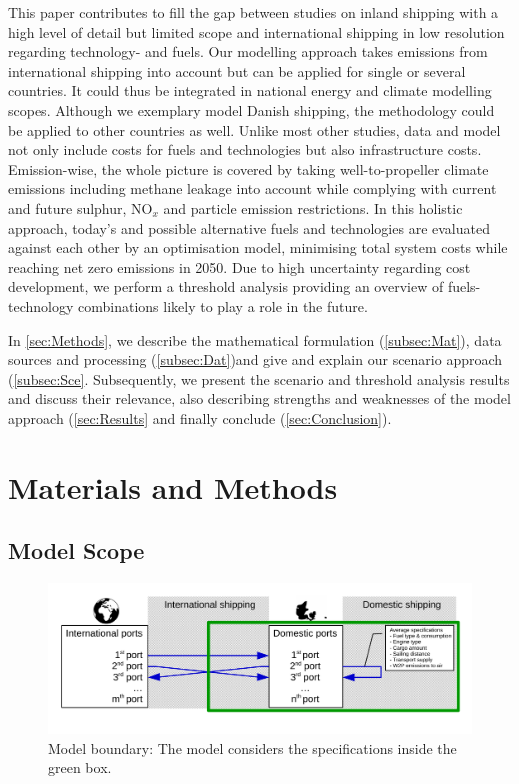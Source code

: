 \documentclass[article]{elsarticle}
\begin{document}
This paper contributes to fill the gap between studies on inland shipping  with a high level of detail but limited scope and international shipping in low resolution regarding technology- and fuels. Our modelling approach takes emissions from international shipping into account but can be applied for single or several countries. It could thus be integrated in national energy and climate modelling scopes. Although we exemplary model Danish shipping, the methodology could be applied to other countries as well.
Unlike most other studies, data and model not only include costs for fuels and technologies but also infrastructure costs. Emission-wise, the whole picture is covered by taking well-to-propeller climate emissions including methane leakage into account while complying with current and future sulphur, NO$_x$ and particle emission restrictions.
In this holistic approach, today's and possible alternative fuels and technologies are evaluated against each other by an optimisation model, minimising total system costs while reaching net zero emissions in 2050. Due to high uncertainty regarding cost development, we perform a threshold analysis providing an overview of fuels-technology combinations likely to play a role in the future.

In \autoref{sec:Methods}, we describe the mathematical formulation (\autoref{subsec:Mat}), data sources and processing (\autoref{subsec:Dat})and give and explain our scenario approach (\autoref{subsec:Sce}. Subsequently, we present the scenario and threshold analysis results and discuss their relevance, also describing strengths and weaknesses of the model approach (\autoref{sec:Results} and finally conclude (\autoref{sec:Conclusion}).  

\section{Materials and Methods}
\label{sec:Methods}

\subsection{Model Scope}
\begin{figure}[htb]
    \centering
    \includegraphics[width=\textwidth]{figures/model_boundary_paper.pdf}
    \caption{Model boundary: The model considers the specifications inside the green box.}
    \label{fig:model_boundary}
\end{figure}
\end{document}
